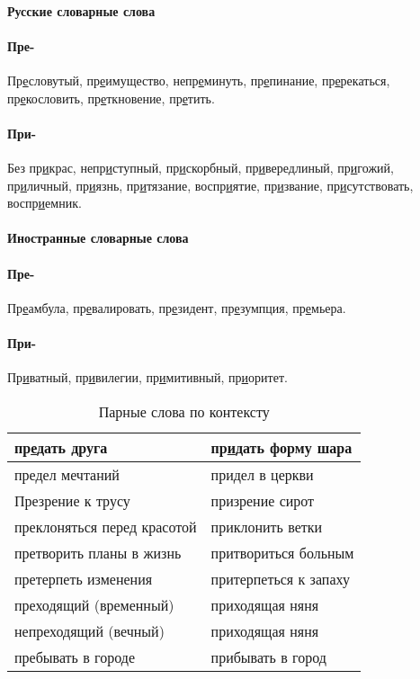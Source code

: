 \documentclass{article}
\begin{document}
\paragraph{Русские словарные слова}

\paragraph{Пре-} Пр\underline{е}словутый, пр\underline{е}имущество, непр\underline{е}минуть,
пр\underline{е}пинание, пр\underline{е}рекаться, пр\underline{е}кословить, пр\underline{е}ткновение,
пр\underline{е}тить.

\paragraph{При-} Без пр\underline{и}крас, непр\underline{и}ступный, пр\underline{и}скорбный,
пр\underline{и}вередлиный, пр\underline{и}гожий, пр\underline{и}личный, пр\underline{и}язнь,
пр\underline{и}тязание, воспр\underline{и}ятие, пр\underline{и}звание, пр\underline{и}сутствовать,
воспр\underline{и}емник.

\paragraph{Иностранные словарные слова}

\paragraph{Пре-} Пр\underline{е}амбула, пр\underline{е}валировать, пр\underline{е}зидент,
пр\underline{е}зумпция, пр\underline{е}мьера.

\paragraph{При-} Пр\underline{и}ватный, пр\underline{и}вилегии, пр\underline{и}митивный,
пр\underline{и}оритет.

\begin{longtable}[c]{|p{3cm}|p{3cm}|}
  \caption{Парные слова по контексту}\\
  \hline
  пр\underline{е}дать друга & пр\underline{и}дать форму шара\\
  \hline
  предел мечтаний & придел в церкви\\
  \hline
  Презрение к трусу & призрение сирот\\
  \hline
  преклоняться перед красотой & приклонить ветки\\
  \hline
  претворить планы в жизнь & притвориться больным\\
  \hline
  претерпеть изменения & притерпеться к запаху\\
  \hline
  преходящий (временный) & приходящая няня\\
  \hline
  непреходящий (вечный) & приходящая няня\\
  \hline
  пребывать в городе & прибывать в город\\
  \hline
\end{longtable}
\end{document}
